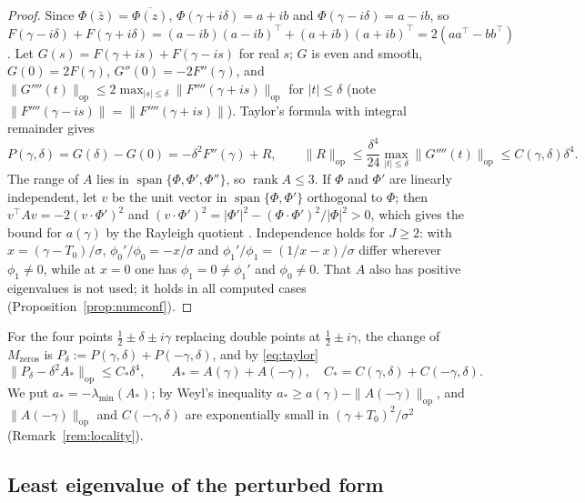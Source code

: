 \documentclass[11pt]{amsart}
\theoremstyle{definition}
\theoremstyle{remark}
\newcommand{\lmin}{\lambda_{\min}}
\begin{document}
\begin{proof}
Since $\Phi(\bar z)=\overline{\Phi(z)}$, $\Phi(\gamma+i\delta)=a+ib$ and
$\Phi(\gamma-i\delta)=a-ib$, so
$F(\gamma-i\delta)+F(\gamma+i\delta)=(a-ib)(a-ib)^{\top}+(a+ib)(a+ib)^{\top}=2(aa^{\top}-bb^{\top})$.
Let $G(s)=F(\gamma+is)+F(\gamma-is)$ for real $s$; $G$ is even and smooth,
$G(0)=2F(\gamma)$, $G''(0)=-2F''(\gamma)$, and
$\|G''''(t)\|_{\mathrm{op}}\le2\max_{|s|\le\delta}\|F''''(\gamma+is)\|_{\mathrm{op}}$
for $|t|\le\delta$ (note $\|F''''(\gamma-is)\|=\|F''''(\gamma+is)\|$). Taylor's
formula with integral remainder gives
\begin{equation}\label{eq:taylor}
  P(\gamma,\delta)=G(\delta)-G(0)=-\delta^2F''(\gamma)+R,\qquad
  \|R\|_{\mathrm{op}}\le\frac{\delta^4}{24}\max_{|t|\le\delta}\|G''''(t)\|_{\mathrm{op}}\le C(\gamma,\delta)\delta^4 .
\end{equation}
The range of $A$ lies in $\operatorname{span}\{\Phi,\Phi',\Phi''\}$, so
$\operatorname{rank}A\le3$. If $\Phi$ and $\Phi'$ are linearly independent,
let $v$ be the unit vector in $\operatorname{span}\{\Phi,\Phi'\}$ orthogonal
to $\Phi$; then $v^{\top}Av=-2(v\cdot\Phi')^2$ and
$(v\cdot\Phi')^2=|\Phi'|^2-(\Phi\cdot\Phi')^2/|\Phi|^2>0$, which gives the
bound for $a(\gamma)$ by the Rayleigh quotient \cite[Thm.~4.2.2]{HJ}.
Independence holds for $J\ge2$: with $x=(\gamma-T_0)/\sigma$,
$\phi_0'/\phi_0=-x/\sigma$ and $\phi_1'/\phi_1=(1/x-x)/\sigma$ differ
wherever $\phi_1\ne0$, while at $x=0$ one has $\phi_1=0\ne\phi_1'$ and
$\phi_0\ne0$. That $A$ also has positive eigenvalues is not used; it holds in
all computed cases (Proposition~\ref{prop:numconf}).
\end{proof}

For the four points $\tfrac12\pm\delta\pm i\gamma$ replacing double points at
$\tfrac12\pm i\gamma$, the change of $M_{\mathrm{zeros}}$ is
$P_\delta:=P(\gamma,\delta)+P(-\gamma,\delta)$, and by \eqref{eq:taylor}
\[
\|P_\delta-\delta^2A_*\|_{\mathrm{op}}\le C_*\delta^4,\qquad
A_*=A(\gamma)+A(-\gamma),\quad C_*=C(\gamma,\delta)+C(-\gamma,\delta).
\]
We put $a_*=-\lmin(A_*)$; by Weyl's inequality $a_*\ge a(\gamma)-\|A(-\gamma)\|_{\mathrm{op}}$,
and $\|A(-\gamma)\|_{\mathrm{op}}$ and $C(-\gamma,\delta)$ are exponentially small
in $(\gamma+T_0)^2/\sigma^2$ (Remark~\ref{rem:locality}).

\subsection{Least eigenvalue of the perturbed form}
\end{document}
